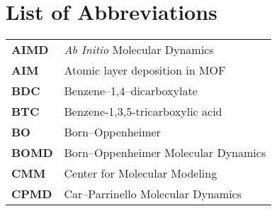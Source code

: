 \chapter{List of Abbreviations}

\vspace{-0.5cm}

\begin{longtable}{p{} p{}}
\hline
\textbf{AIMD} & \textit{Ab Initio} Molecular Dynamics \\
\textbf{AIM} & Atomic layer deposition in MOF\\
\textbf{BDC} & Benzene--1,4--dicarboxylate \\
\textbf{BTC} & Benzene-1,3,5-tricarboxylic acid \\
\textbf{BO} & Born--Oppenheimer \\
\textbf{BOMD} & Born--Oppenheimer Molecular Dynamics\\
\textbf{CMM} & Center for Molecular Modeling \\
\textbf{CPMD} & Car--Parrinello Molecular Dynamics\\

\end{longtable}
